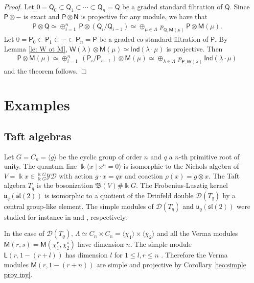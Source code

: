 \documentclass[reqno]{amsart}
\renewcommand{\_}[1]{_{\left( #1 \right)}}
\renewcommand{\^}[1]{^{\left( #1 \right)}}
\newcommand{\ot}{{\otimes}}
\newcommand{\ku}{\Bbbk}
\newcommand\fInd{\mathsf{Ind}}
\newcommand\fL{\mathsf{L}}
\newcommand\fM{\mathsf{M}}
\newcommand\fN{\mathsf{N}}
\newcommand\fP{\mathsf{P}}
\newcommand\fQ{\mathsf{Q}}
\newcommand\fW{\mathsf{W}}
\newcommand{\D}{\mathcal{D}}
\newcommand{\BV}{{\mathfrak B}}
\newcommand{\ydg}{{}^{\ku G}_{\ku G}\mathcal{YD}}
\theoremstyle{plain}
\theoremstyle{definition}
\theoremstyle{remark}
\begin{document}
\begin{proof}
Let $0=\fQ_0\subset\fQ_1\subset\cdots\subset\fQ_n=\fQ$ be a graded standard filtration of $\fQ$. Since $\fP\ot-$ is exact and $\fP\ot\fN$ is projective for any module, we have that
\begin{align*}
\fP\ot\fQ\simeq\oplus_{i=1}^n\,\fP\ot(\fQ_i/\fQ_{i-1})\simeq\oplus_{\mu\in\Lambda}\,p_{\fQ,\fM(\mu)}\,\fP\ot\fM(\mu).
\end{align*}
Let $0=\fP_0\subset\fP_1\subset\cdots\subset\fP_n=\fP$ be a graded co-standard filtration of $\fP$. By Lemma \ref{le: W ot M}, $\fW(\lambda)\ot\fM(\mu)\simeq\fInd(\lambda\cdot\mu)$ is projective. Then
\begin{align*}
\fP\ot\fM(\mu)\simeq\oplus_{i=1}^n\,(\fP_i/\fP_{i-1})\ot\fM(\mu)\simeq\oplus_{\lambda\in\Lambda}\,p_{\fP,\fW(\lambda)}\,\fInd(\lambda\cdot\mu)
\end{align*}
and the theorem follows.
\end{proof}





\section{Examples}\label{sec:examples}

\subsection{Taft algebras} Let $G=C_n=\langle g\rangle$ be the cyclic group of order $n$ and $q$ a $n$-th primitive root of unity. The quantum line $\ku\langle x \mid x^n=0\rangle$ is isomorphic to the Nichols algebra of $V=\ku x\in\ydg$ with action $g\cdot x=qx$ and coaction $\rho(x)=g\ot x$. The Taft algebra $T_q$ is the bosonization $\BV(V)\#\ku G$. The Frobenius-Lusztig kernel $\mathfrak{u}_q(\mathfrak{sl}(2))$ is isomorphic to a quotient of the Drinfeld double $\D(T_q)$ by a central group-like element. The simple modules of $\D(T_q)$ and $\mathfrak{u}_q(\mathfrak{sl}(2))$ were studied for instance in \cite{MR1743667} and \cite{MR1272539,MR1265478,MR2769244,MR1284788}, respectively. 

In the case of $\D(T_q)$, $\Lambda\simeq C_n\times C_n=\langle\chi_1\rangle\times\langle\chi_2\rangle$ and all the Verma modules $\fM(r,s)=\fM(\chi_1^r,\chi_2^s)$ have dimension $n$. The simple module $\fL(r,1-(r+l))$ has dimension $l$ for $1\leq l,r\leq n$ \cite[Theorem 2.5]{MR1743667}. Therefore the Verma modules $\fM(r,1-(r+n))$ are simple and projective by Corollary \ref{teo:simple proy iny}. 
\end{document}
